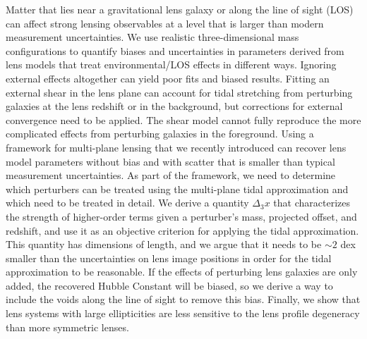 Matter that lies near a gravitational lens galaxy or along the line of sight (LOS) can affect strong lensing observables at a level that is larger than modern measurement uncertainties. We use realistic three-dimensional mass configurations to quantify biases and uncertainties in parameters derived from lens models that treat environmental/LOS effects in different ways. Ignoring external effects altogether can yield poor fits and biased results. Fitting an external shear in the lens plane can account for tidal stretching from perturbing galaxies at the lens redshift or in the background, but corrections for external convergence need to be applied. The shear model cannot fully reproduce the more complicated effects from perturbing galaxies in the foreground. Using a framework for multi-plane lensing that we recently introduced \citep{McCully14} can recover lens model parameters without bias and with scatter that is smaller than typical measurement uncertainties. As part of the framework, we need to determine which perturbers can be treated using the multi-plane tidal approximation and which need to be treated in detail. We derive a quantity $\Delta_3 x$ that characterizes the strength of higher-order terms given a perturber's mass, projected offset, and redshift, and use it as an objective criterion for applying the tidal approximation. This quantity has dimensions of length, and we argue that it needs to be $\sim 2$ dex smaller than the uncertainties on lens image positions in order for the tidal approximation to be reasonable. If the effects of perturbing lens galaxies are only added, the recovered Hubble Constant will be biased, so we derive a way to include the voids along the line of sight to remove this bias. Finally, we show that lens systems with large ellipticities are less sensitive to the lens profile degeneracy than more symmetric lenses.
  